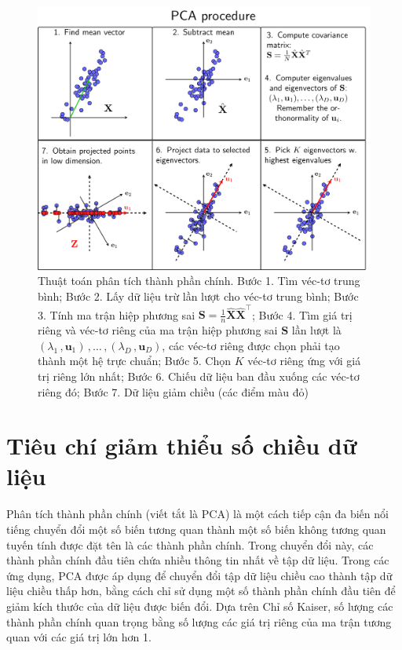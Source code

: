 \documentclass[../thesis.tex]{subfiles}
\begin{document}
\begin{figure}[H]
	\centering
	\includegraphics[width=0.8\linewidth]{images/pca_procedure}
	\caption[Thuật toán phân tích thành phần chính]{Thuật toán phân tích thành phần chính. Bước 1. Tìm véc-tơ trung bình; Bước 2. Lấy dữ liệu trừ lần lượt cho véc-tơ trung bình; Bước 3. Tính ma trận hiệp phương sai $ \mathbf{S} = \frac{1}{n}\widehat{\mathbf{X}} \widehat{\mathbf{X}}^\top $; Bước 4. Tìm giá trị riêng và véc-tơ riêng của ma trận hiệp phương sai $ \mathbf{S} $ lần lượt là $ (\lambda_1\,,\mathbf{u}_1)\,,\ldots\,,(\lambda_D\,,\mathbf{u}_D) $, các véc-tơ riêng được chọn phải tạo thành một hệ trực chuẩn; Bước 5. Chọn $ K $ véc-tơ riêng ứng với giá trị riêng lớn nhất; Bước 6. Chiếu dữ liệu ban đầu xuống các véc-tơ riêng đó; Bước 7. Dữ liệu giảm chiều (các điểm màu đỏ)}
	\label{fig:pcaprocedure}
\end{figure}













\section{Tiêu chí giảm thiểu số chiều dữ liệu}
Phân tích thành phần chính (viết tắt là PCA) là một cách tiếp cận đa biến nổi tiếng chuyển đổi một số biến tương quan thành một số biến không tương quan tuyến tính được đặt tên là các thành phần chính. Trong chuyển đổi này, các thành phần chính đầu tiên chứa nhiều thông tin nhất về tập dữ liệu. Trong các ứng dụng, PCA được áp dụng để chuyển đổi tập dữ liệu chiều cao thành tập dữ liệu chiều thấp hơn, bằng cách chỉ sử dụng một số thành phần chính đầu tiên để giảm kích thước của dữ liệu được biến đổi. Dựa trên Chỉ số Kaiser, số lượng các thành phần chính quan trọng bằng số lượng các giá trị riêng của ma trận tương quan với các giá trị lớn hơn 1.
\end{document}
